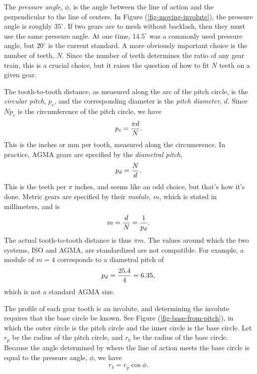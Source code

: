 \documentclass[10pt]{article}
\begin{document}
The \emph{pressure angle}, $\phi$, is the angle between the line of
action and the perpendicular to the line of centers. In Figure
(\ref{fig-moving-involute}), the pressure angle is roughly $35^\circ$.
If two gears are to mesh without backlash, then they must use the same
pressure angle. At one time, $14.5^\circ$ was a commonly used pressure
angle, but $20^\circ$ is the current standard.
A more obviously important choice is the number of teeth, $N$. Since
the number of teeth determines the ratio of any gear train, this is a crucial
choice, but it raises the question of how to fit $N$ teeth on a given
gear.

The tooth-to-tooth distance, as measured along the arc of the pitch
circle, is the \emph{circular pitch}, $p_c$, and the corresponding
diameter is the \emph{pitch diameter}, $d$. Since $N p_c$ is the
circumference of the pitch circle, we have
$$p_c = {\pi d\over N}.$$
This is the inches or mm per tooth, measured along the circumerence. In
practice, AGMA gears are specified by the \emph{diametral pitch}, 
$$p_d = {N\over d}.$$
This is the teeth per $\pi$ inches, and seems like an odd
choice, but that's how it's done.
Metric gears are specified by their \emph{module}, $m$, which is
stated in millimeters, and is
$$m = {d\over N} = {1\over p_d}.$$
The actual tooth-to-tooth distance is thus $\pi m$. 
The values around which the two systems, ISO and AGMA,
are standardized are not compatible. For example, a module of $m=4$
corresponds to a diametral pitch of
$$p_d = {25.4\over 4} = 6.35,$$
which is not a standard AGMA size.

The profile of each gear tooth is an involute, and determining the
involute requires that the base circle be known. See Figure
(\ref{fig-base-from-pitch}), in which the outer circle is the pitch circle and
the inner circle is the base circle. Let $r_p$ be the radius of the
pitch circle, and $r_b$ be the radius of the base circle. Because the
angle determined by where the line of action meets the base circle is
equal to the pressure angle, $\phi$, we have
$$r_b = r_p \cos\phi.$$
\end{document}
